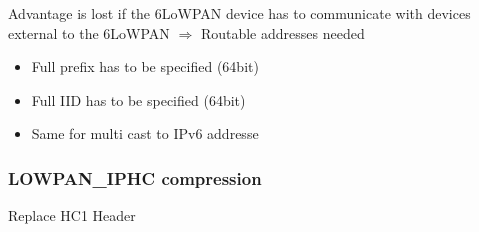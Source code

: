 \begin{itemize}
        \consitem{} Advantage is lost if the 6LoWPAN device has to
        communicate with devices external to the 6LoWPAN $\Rightarrow$
        Routable addresses needed

        \begin{itemize}
            \item Full prefix has to be specified (64bit)
            \item Full IID has to be specified (64bit)
            \item Same for multi cast to IPv6 addresse
        \end{itemize}

\end{itemize}


\subsubsection{LOWPAN\_IPHC compression}
Replace HC1 Header


